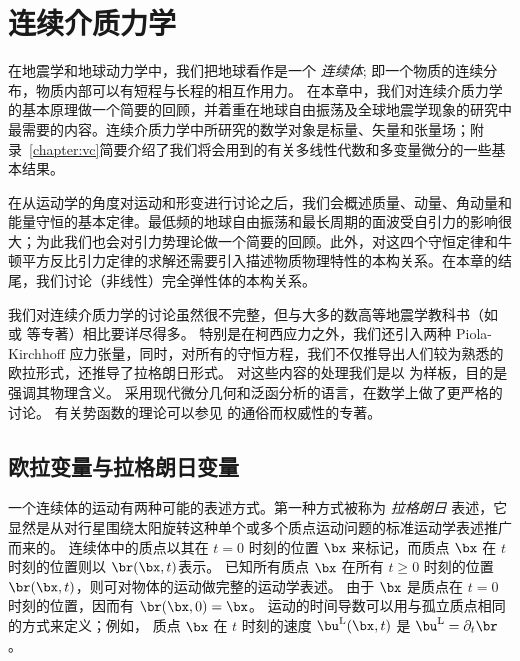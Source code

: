 \chapter{连续介质力学}

在地震学和地球动力学中，我们把地球看作是一个 {\em 连续体\/};
%
即一个物质的连续分布，物质内部可以有短程与长程的相互作用力。
%
%
%
%
在本章中，我们对连续介质力学的基本原理做一个简要的回顾，并着重在地球自由振荡及全球地震学现象的研究中最需要的内容。连续介质力学中所研究的数学对象是标量、矢量和张量场；附录~\ref{chapter:vc}简要介绍了我们将会用到的有关多线性代数和多变量微分的一些基本结果。

在从运动学的角度对运动和形变进行讨论之后，我们会概述质量、动量、角动量和能量守恒的基本定律。最低频的地球自由振荡和最长周期的面波受自引力的影响很大；为此我们也会对引力势理论做一个简要的回顾。此外，对这四个守恒定律和牛顿平方反比引力定律的求解还需要引入描述物质物理特性的本构关系。在本章的结尾，我们讨论（非线性）完全弹性体的本构关系。

我们对连续介质力学的讨论虽然很不完整，但与大多的数高等地震学教科书（如\textcite{aki&richards80} 或 \textcite{ben-menahem&singh81}等专著）相比要详尽得多。
特别是在柯西应力之外，我们还引入两种 Piola-Kirchhoff
应力张量，同时，对所有的守恒方程，我们不仅推导出人们较为熟悉的欧拉形式，还推导了拉格朗日形式。
对这些内容的处理我们是以 \textcite{malvern69}为样板，目的是强调其物理含义。
\textcite{marsden&hughes83}采用现代微分几何和泛函分析的语言，在数学上做了更严格的讨论。
有关势函数的理论可以参见 \textcite{kellogg67}的通俗而权威性的专著。

\section{欧拉变量与拉格朗日变量}
%
%

一个连续体的运动有两种可能的表述方式。第一种方式被称为 {\em 拉格朗日\/} 表述，它显然是从对行星围绕太阳旋转这种单个或多个质点运动问题的标准运动学表述推广而来的。
连续体中的质点以其在 $t=0$ 时刻的位置
%
$\bx$ 来标记，而质点 $\bx$ 在 $t$ 时刻的位置则以 $\br(\bx,t)$表示。
已知所有质点 $\bx$ 在所有 $t \geq 0$ 时刻的位置 $\br(\bx,t)$，则可对物体的运动做完整的运动学表述。
由于 $\bx$ 是质点在
$t=0$ 时刻的位置，因而有 $\br(\bx,0)=\bx$。
运动的时间导数可以用与孤立质点相同的方式来定义；例如，
质点 $\bx$ 在 $t$ 时刻的速度 $\bu^{\rm L}(\bx,t)$ 是 $\bu^{\rm L}=\partial_t\br$。

